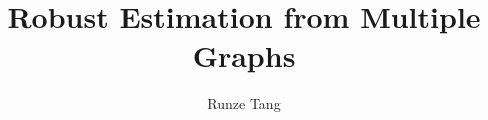 \documentclass[12pt,oneside,final]{thesis}
\begin{document}
\title{Robust Estimation from Multiple Graphs}
\author{Runze Tang}
\dissertation
\doctorphilosophy
\copyrightnotice









%


%
%

\def\newblock{\hskip .11em plus.33em minus.07em}




\end{document}
